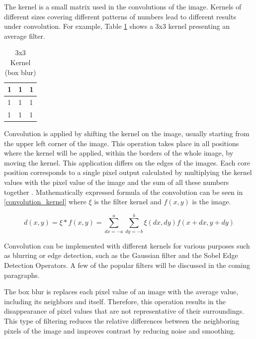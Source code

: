 The kernel is a small matrix used in the convolutions of the image. Kernels of different sizes covering different patterns of numbers lead to different results under convolution. For example, Table \ref{tab:Kernal3_3} shows a 3x3 kernel presenting an average filter.

\begin{table}[htbp]
\begin{center}
\caption{3x3 Kernel (box blur)}
\vspace{23pt}
      \begin{tabular}{|l|l|l|}
        \hline
        1 & 1 & 1   \\
        \hline
        1 & 1 & 1   \\
        \hline
        1 & 1 & 1   \\
        \hline
      \end{tabular}
\label{tab:Kernal3_3}
\end{center}
\end{table}

Convolution is applied by shifting the kernel on the image, usually starting from the upper left corner of the image. This operation takes place in all positions where the kernel will be applied, within the borders of the whole image, by moving the kernel. This application differs on the edges of the images. Each core position corresponds to a single pixel output calculated by multiplying the kernel values with the pixel value of the image and the sum of all these numbers together \cite{russ2010image}. Mathematically expressed formula of the convolution can be seen in \ref{convolution_kernel} where  \(\xi\) is the filter kernel and \(f(x,y)\) is the image.

\begin{equation} \label{convolution_kernel}
d(x,y) = \xi * f(x,y) = \sum_{dx=-a}^{a} \sum_{dy=-b}^{b} \xi(dx,dy) f(x + dx, y + dy)
\end{equation}

Convolution can be implemented with different kernels for various purposes such as blurring or edge detection, such as the Gaussian filter and the Sobel Edge Detection Operators. A few of the popular filters will be discussed in the coming paragraphs.

The box blur is replaces each pixel value of an image with the average value, including its neighbors and itself. Therefore, this operation results in the disappearance of pixel values that are not representative of their surroundings. This type of filtering reduces the relative differences between the neighboring pixels of the image and improves contrast by reducing noise and smoothing.

